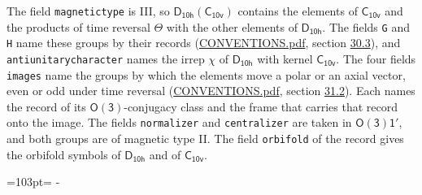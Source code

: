 \documentclass[10pt,a4paper]{article}
\newcommand{\needspace}[1]{\par\penalty-100\begingroup\dimen0=#1\relax\dimen2=\pagegoal
  \advance\dimen2-\pagetotal\ifdim\dimen0>\dimen2\relax\ifdim\dimen2>0pt\vfil\break\fi\fi
  \endgroup}
\numberwithin{equation}{section}
\newcommand{\grp}[1]{\mathsf{#1}}
\begin{document}
The field \texttt{magnetictype} is III, so $\grp{D_{10h}}(\grp{C_{10v}})$ contains the elements of $\grp{C_{10v}}$ and the products of time reversal $\varTheta$ with the other elements of $\grp{D_{10h}}$. The fields \texttt{G} and \texttt{H} name these groups by their records (\href{../../CONVENTIONS.pdf}{CONVENTIONS.pdf}, section \href{../../CONVENTIONS.pdf\#conv.30.3}{30.3}), and \texttt{antiunitarycharacter} names the irrep $\chi$ of $\grp{D_{10h}}$ with kernel $\grp{C_{10v}}$. The four fields \texttt{images} name the groups by which the elements move a polar or an axial vector, even or odd under time reversal (\href{../../CONVENTIONS.pdf}{CONVENTIONS.pdf}, section \href{../../CONVENTIONS.pdf\#conv.31.2}{31.2}). Each names the record of its $\grp{O(3)}$-conjugacy class and the frame that carries that record onto the image. The fields \texttt{normalizer} and \texttt{centralizer} are taken in $\grp{O(3)1'}$, and both groups are of magnetic type II. The field \texttt{orbifold} of the record gives the orbifold symbols of $\grp{D_{10h}}$ and of $\grp{C_{10v}}$.
\needspace{103pt}
\end{document}

